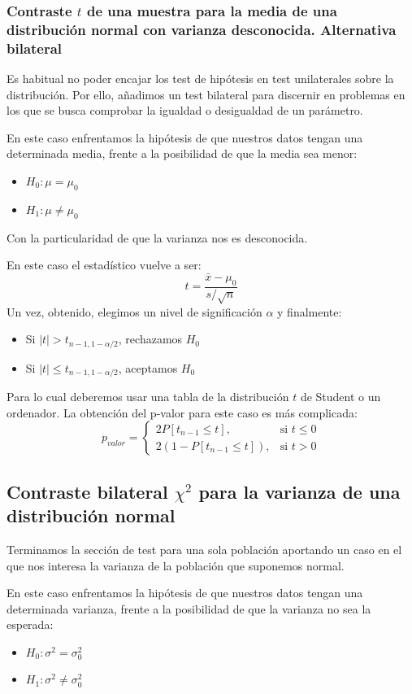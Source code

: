 \documentclass[a4paper,12pt]{article}
\begin{document}
\subsubsection{Contraste $t$ de una muestra para la media de una distribución normal con varianza desconocida. Alternativa bilateral}
Es habitual no poder encajar los test de hipótesis en test unilaterales sobre la distribución. Por ello, añadimos un test bilateral para discernir en problemas en los que se busca comprobar la igualdad o desigualdad de un parámetro.

En este caso enfrentamos la hipótesis de que nuestros datos tengan una determinada media, frente a la posibilidad  de que la media sea menor: 
\begin{itemize}
	\item $H_0:\mu=\mu_0$
	\item $H_1: \mu\neq \mu_0$
\end{itemize}
Con la particularidad de que la varianza nos es desconocida.

En este caso el estadístico vuelve a ser: 
$$t=\frac{\bar{x}-\mu_0}{s/\sqrt{n}}$$
Un vez, obtenido, elegimos un nivel de significación $\alpha$ y finalmente:
\begin{itemize}
	\item Si $|t|>t_{n-1,1-\alpha/2}$, rechazamos $H_0$
	\item Si $|t|\leq t_{n-1,1-\alpha/2}$, aceptamos $H_0$
\end{itemize}
Para lo cual deberemos usar una tabla de la distribución $t$ de Student o un ordenador.
La obtención del p-valor para este caso es más complicada:
$$p_{valor} = \begin{cases} 2P[t_{n-1}\leq t], & \mbox{si } t\leq 0 \\ 2(1-P[t_{n-1}\leq t]), & \mbox{si } t>0 \end{cases}$$

\subsection{Contraste bilateral $\chi^2$ para la varianza de una distribución normal}

Terminamos la sección de test para una sola población aportando un caso en el que nos interesa la varianza de la población que suponemos normal.

En este caso enfrentamos la hipótesis de que nuestros datos tengan una determinada varianza, frente a la posibilidad  de que la varianza no sea la esperada: 
\begin{itemize}
	\item $H_0:\sigma^2=\sigma^2_0$
	\item $H_1: \sigma^2\neq\sigma^2_0$
\end{itemize}
\end{document}
